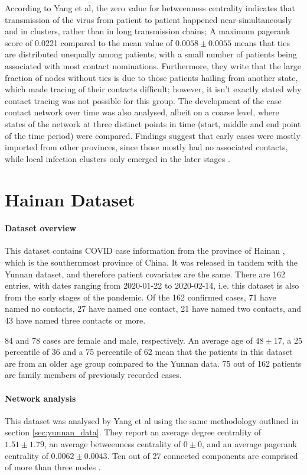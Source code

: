 According to Yang et al, the zero value for betweenness centrality indicates that transmission of the virus from patient to patient happened near-simultaneously and in clusters, rather than in long transmission chains; A maximum pagerank score of 0.0221 compared to the mean value of $0.0058\pm0.0055$ means that ties are distributed unequally among patients, with a small number of patients being associated with most contact nominations. Furthermore, they write that the large fraction of nodes without ties is due to those patients hailing from another state, which made tracing of their contacts difficult; however, it isn't exactly stated why contact tracing was not possible for this group. The development of the case contact network over time was also analysed, albeit on a coarse level, where states of the network at three distinct points in time (start, middle and end point of the time period) were compared. Findings suggest that early cases were mostly imported from other provinces, since those mostly had no associated contacts, while local infection clusters only emerged in the later stages \cite{hainan_publication}. 

\section{Hainan Dataset}
\label{sec:hainan_data}

\paragraph{Dataset overview} This dataset contains COVID case information from the province of Hainan \cite{hainan_data}, which is the southernmost province of China. It was released in tandem with the Yunnan dataset, and therefore patient covariates are the same. There are 162 entries, with dates ranging from 2020-01-22 to 2020-02-14, i.e. this dataset is also from the early stages of the pandemic. Of the 162 confirmed cases, 71 have named no contacts, 27 have named one contact, 21 have named two contacts, and 43 have named three contacts or more. 

84 and 78 cases are female and male, respectively. An average age of $48\pm17$, a 25 percentile of 36 and a 75 percentile of 62 mean that the patients in this dataset are from an older age group compared to the Yunnan data. 75 out of 162 patients are family members of previously recorded cases.

\paragraph{Network analysis} This dataset was analysed by Yang et al using the same methodology outlined in section \ref{sec:yunnan_data}. They report an average degree centrality of $1.51\pm1.79$, an average betweenness centrality of $0\pm0$, and an average pagerank centrality of $0.0062\pm0.0043$. Ten out of 27 connected components are comprised of more than three nodes \cite{hainan_publication}. 

